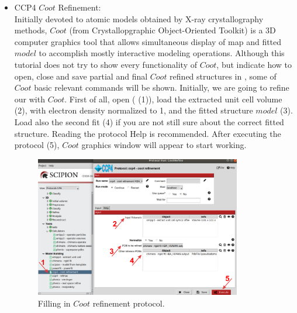 \begin{itemize}
 \item CCP4 $Coot$ Refinement:\\
 
 Initially devoted to atomic models obtained by X-ray crystallography methods, $Coot$ (from Crystallopgraphic Object-Oriented Toolkit) is a 3D computer graphics tool that allows simultaneous display of map and fitted $model$ to accomplish mostly interactive modeling operations. Although this tutorial does not try to show every functionality of $Coot$, but indicate how to open, close and save partial and final $Coot$ refined structures in \scipion, some of $Coot$ basic relevant commands will be shown. Initially, we are going to refine our  with $Coot$. First of all, open  ( (1)), load the extracted unit cell volume (2), with electron density normalized to 1, and the fitted structure $model$ (3). Load also the second fit (4) if you are not still sure about the correct fitted structure. Reading the protocol Help is recommended. After executing the protocol (5), $Coot$ graphics window will appear to start working. 
 
 \begin{figure}[H]
  \centering 
  \captionsetup{width=.7\linewidth} 
  \includegraphics[width=0.85\textwidth]{Images/Fig24.png}
  \caption{Filling in $Coot$ refinement protocol.}
  \label{fig:coot_refinement_protocol}
  \end{figure}
  

\end{itemize}
